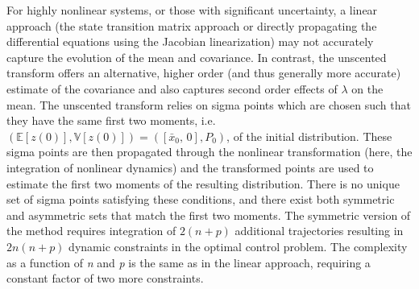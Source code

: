 \documentclass[10pt,a4paper]{article}
\begin{document}
	For highly nonlinear systems, or those with significant uncertainty, a linear approach (the state transition matrix approach or directly propagating the differential equations using the Jacobian linearization) may not accurately capture the evolution of the mean and covariance. In contrast, the unscented transform \cite{UT,UKF1} offers an alternative, higher order (and thus generally more accurate) estimate of the covariance and also captures second order effects of $\lambda$ on the mean. The unscented transform relies on sigma points which are chosen such that they have the same first two moments, i.e. $ (\mathbb{E}[z(0)],\mathbb{V}[z(0)]) = ([\bar{x}_0,\,0],P_0) $, of the initial distribution. These sigma points are then propagated through the nonlinear transformation (here, the integration of nonlinear dynamics) and the transformed points are used to estimate the first two moments of the resulting distribution. There is no unique set of sigma points satisfying these conditions, and there exist both symmetric and asymmetric \cite{UT_simplex} sets that match the first two moments. The symmetric version of the method requires integration of $2(n+p)$ additional trajectories resulting in $2n(n+p)$ dynamic constraints in the optimal control problem. The complexity as a function of \textit{n} and \textit{p} is the same as in the linear approach, requiring a constant factor of two more constraints. 
	
\end{document}
